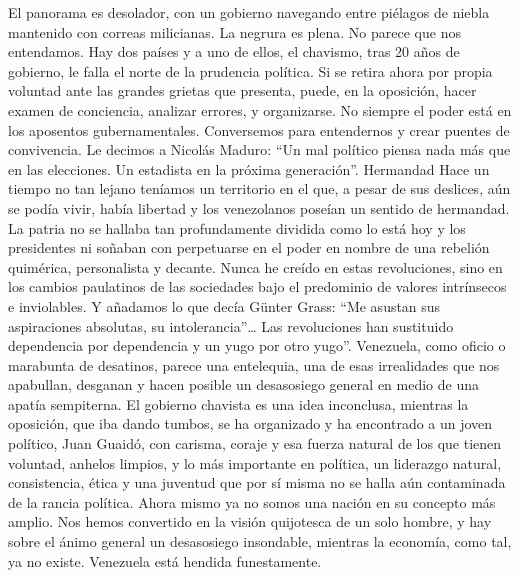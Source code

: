\documentclass{article}%
\begin{document}
\newline%
%
El panorama es desolador, con un gobierno navegando entre piélagos de niebla mantenido con correas milicianas.%
\newline%
%
La negrura es plena. No parece que nos entendamos. Hay dos países y a uno de ellos, el chavismo, tras 20 años de gobierno, le falla el norte de la prudencia política. Si se retira ahora por propia voluntad ante las grandes grietas que presenta, puede, en la oposición, hacer examen de conciencia, analizar errores, y organizarse. No siempre el poder está en los aposentos gubernamentales.%
\newline%
%
Conversemos para entendernos y crear puentes de convivencia. Le decimos a Nicolás Maduro: “Un mal político piensa nada más que en las elecciones. Un estadista en la próxima generación”.%
\newline%
%
Hermandad%
\newline%
%
Hace un tiempo no tan lejano teníamos un territorio en el que, a pesar de sus deslices, aún se podía vivir, había libertad y los venezolanos poseían un sentido de hermandad. La patria no se hallaba tan profundamente dividida como lo está hoy y los presidentes ni soñaban con perpetuarse en el poder en nombre de una rebelión quimérica, personalista y decante.%
\newline%
%
Nunca he creído en estas revoluciones, sino en los cambios paulatinos de las sociedades bajo el predominio de valores intrínsecos e inviolables.%
\newline%
%
Y añadamos lo que decía Günter Grass: “Me asustan sus aspiraciones absolutas, su intolerancia”… Las revoluciones han sustituido dependencia por dependencia y un yugo por otro yugo”.%
\newline%
%
Venezuela, como oficio o marabunta de desatinos, parece una entelequia, una de esas irrealidades que nos apabullan, desganan y hacen posible un desasosiego general en medio de una apatía sempiterna.%
\newline%
%
El gobierno chavista es una idea inconclusa, mientras la oposición, que iba dando tumbos, se ha organizado y ha encontrado a un joven político, Juan Guaidó, con carisma, coraje y esa fuerza natural de los que tienen voluntad, anhelos limpios, y lo más importante en política, un liderazgo natural, consistencia, ética y una juventud que por sí misma no se halla aún contaminada de la rancia política.%
\newline%
%
Ahora mismo ya no somos una nación en su concepto más amplio. Nos hemos convertido en la visión quijotesca de un solo hombre, y hay sobre el ánimo general un desasosiego insondable, mientras la economía, como tal, ya no existe. Venezuela está hendida funestamente.%
\end{document}
